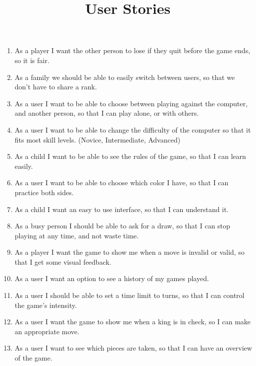 \documentclass{article}
\title{User Stories}
\begin{document}
\date{}
\maketitle

\begin{enumerate}

\item	As a player I want the other person to lose if they quit before the game ends, so it is fair.

\item	As a family we should be able to easily switch between users, so that we don’t have to share a rank.

\item	As a user I want to be able to choose between playing against the computer, and another person, so that I can play alone, or with others.

\item	As a user I want to be able to change the difficulty of the computer so that it fits most skill levels. 
		(Novice, Intermediate, Advanced)

\item	As a child I want to be able to see the rules of the game, so that I can learn easily.

\item	As a user I want to be able to choose which color I have, so that I can practice both sides. 

\item	As a child I want an easy to use interface, so that I can understand it.

\item	As a busy person I should be able to ask for a draw, so that I can stop playing at any time, and not waste time.

\item	As a player I want the game to show me when a move is invalid or valid, so that I get some visual feedback.

\item	As a user I want an option to see a history of my games played.

\item	As a user I should be able to set a time limit to turns, so that I can control the game's intensity. 

\item	As a user I want the game to show me when a king is in check, so I can make an appropriate move.

\item	As a user I want to see which pieces are taken, so that I can have an overview of the game.


\end{enumerate}
\end{document}
